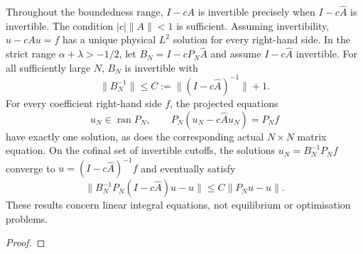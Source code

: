 \begin{theorem}
\label{thm:power-law-second-kind-solves}
\leanok
Throughout the boundedness range, $I-cA$ is invertible precisely when
$I-c\widehat A$ is invertible. The condition $|c|\|A\|<1$ is sufficient.
Assuming invertibility, $u-cAu=f$ has a unique physical $L^2$ solution
for every right-hand side.
In the strict range $\alpha+\lambda>-1/2$, let
$B_N=I-cP_N\widehat A$ and assume $I-c\widehat A$ invertible.
For all sufficiently large $N$, $B_N$ is invertible with
\[
 \|B_N^{-1}\|\le C:=\|(I-c\widehat A)^{-1}\|+1.
\]
For every coefficient right-hand side $f$, the projected equations
\[
 u_N\in\operatorname{ran}P_N,\qquad P_N(u_N-c\widehat A u_N)=P_Nf
\]
have exactly one solution, as does the corresponding actual $N\times N$
matrix equation. On the cofinal set of invertible cutoffs, the solutions $u_N=B_N^{-1}P_Nf$ converge to
$u=(I-c\widehat A)^{-1}f$ and eventually satisfy
\[
 \|B_N^{-1}P_N(I-c\widehat A)u-u\|\le C\|P_Nu-u\|.
\]
 These results concern linear integral equations, not equilibrium or
optimisation problems.
\end{theorem}
\begin{proof}
\leanok
\end{proof}



